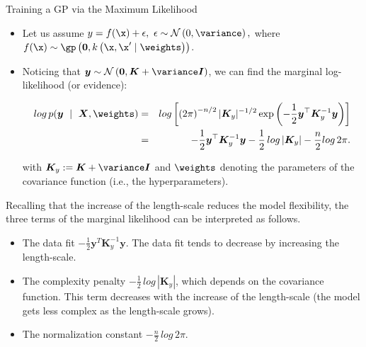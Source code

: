 \begin{frame}[c,allowframebreaks]{Training a GP via the Maximum Likelihood}

\begin{itemize}
\item Let us assume $y = f(\x) + \epsilon, ~ \epsilon \sim \mathcal{N}\left(0, \variance\right),$ where $f(\x) \sim \gp\left(\bm{0}, k\left(\x, \x^\prime \mid \thetab \right)\right)$.

\lz
\lz

\item Noticing that $\bm{y} \sim \mathcal{N}\left(\bm{0}, \bm{K} + \variance \id\right)$, we can find the marginal log-likelihood (or evidence):

\vspace{-5mm}

\begin{eqnarray*}
log\, p(\bm{y} ~\mid~ \bm{X}, \thetab) &=& log \left[\left(2 \pi\right)^{-n / 2} |\bm{K}_y|^{-1 / 2} \exp\left(- \frac{1}{2} \bm{y}^\top \bm{K}_y^{-1} \bm{y}\right) \right]\\
&=& -\frac{1}{2}\bm{y}^\top\bm{K}_y^{-1} \bm{y} - \frac{1}{2}\, log \left| \bm{K}_y \right| - \frac{n}{2} log\,2\pi.
\end{eqnarray*}

with $\bm{K}_y:=\bm{K} + \variance \id$ and $\thetab$ denoting the parameters of the covariance function (i.e., the hyperparameters).
\end{itemize}

\framebreak

Recalling that the increase of the length-scale reduces the model flexibility, the three terms of the marginal likelihood can be interpreted as follows.
\vspace{1cm}

\begin{itemize}
\item The data fit $-\frac{1}{2}\bm{y}^T\bm{K}_y^{-1} \bm{y}$. The data fit tends to decrease by increasing the length-scale.
\vspace{.5cm}

\item The complexity penalty $- \frac{1}{2}\,log\,\left| \bm{K}_y \right|$, which depends on the covariance function. This term decreases with the increase of the length-scale (the model gets less complex as the length-scale grows).
\vspace{.5cm}

\item The normalization constant $- \frac{n}{2}\,log\,2\pi$.
\end{itemize}


\end{frame}

